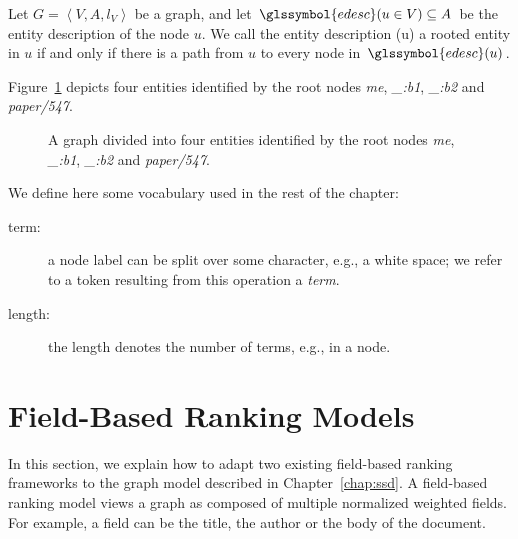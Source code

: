 \begin{definition}
Let $G = \left\langle V, A, l_V \right\rangle$ be a graph, and let $\glssymbol{edesc}(u \in V) \subseteq A$ be the entity description of the node $u$. We call the entity description (u) a rooted entity in $u$ if and only if there is a path from $u$ to every node in $\glssymbol{edesc}(u)$.
\end{definition}

Figure~\ref{fig:entities} depicts four entities identified by the root nodes \emph{me}, \emph{\_:b1}, \emph{\_:b2} and \emph{paper/547}.

\begin{figure}
	\centering
	\caption{A graph divided into four entities identified by the root nodes \emph{me}, \emph{\_:b1}, \emph{\_:b2} and \emph{paper/547}.}
	\label{fig:entities}
\end{figure}

We define here some vocabulary used in the rest of the chapter:
\begin{description}
	\item[term:] a node label can be split over some character, e.g., a white space; we refer to a token resulting from this operation a \emph{term}.
	\item[length:] the length denotes the number of terms, e.g., in a node.
\end{description}

\section{Field-Based Ranking Models}
\label{sec:ranking-wod}

In this section, we explain how to adapt two existing \gls{field}-based ranking frameworks to the graph model described in Chapter~\ref{chap:ssd}.
A field-based ranking model views a graph as composed of multiple normalized weighted fields. For example, a field can be the title, the author or the body of the document.\\

